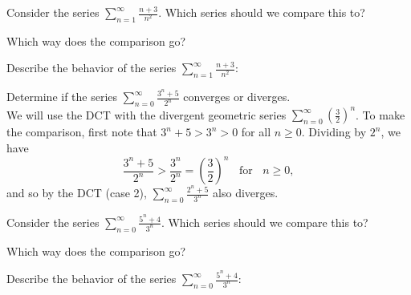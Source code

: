 \documentclass{ximera}
\begin{document}
\begin{problem}
Consider the series $\sum_{n=1}^\infty \frac{n+3}{n^2}$.
Which series should we compare this to?

\begin{multipleChoice}
\end{multipleChoice}

Which way does the comparison go?
\begin{multipleChoice}
\end{multipleChoice}

Describe the behavior of the series $\sum_{n=1}^\infty \frac{n+3}{n^2}:$
\begin{multipleChoice}
\end{multipleChoice}

\end{problem}



\begin{example}[Divergence] %
Determine if the series $\sum_{n=0}^\infty \frac{3^n + 5}{2^n}$ converges or diverges.\\
We will use the DCT with the divergent geometric series $\sum_{n=0}^\infty \left(\frac32\right)^n$. 
To make the comparison, first note that $3^n + 5 > 3^n > 0$ for all $n \geq 0$. Dividing by $2^n$, we have 
\[
\frac{3^n + 5}{2^n} > \frac{3^n}{2^n} = \left(\frac32\right)^n \;\; \text{ for } \;\; n \geq 0,
\]
and so by the DCT (case 2), $\sum_{n=0}^\infty \frac{2^n + 5}{3^n}$ also diverges.
\end{example}


\begin{problem}
Consider the series $\sum_{n=0}^\infty \frac{5^n + 4}{3^n}$.
Which series should we compare this to?

\begin{multipleChoice}
\end{multipleChoice}

Which way does the comparison go?
\begin{multipleChoice}
\end{multipleChoice}

Describe the behavior of the series $\sum_{n=0}^\infty \frac{5^n + 4}{3^n}:$
\begin{multipleChoice}
\end{multipleChoice}

\end{problem}
\end{document}
